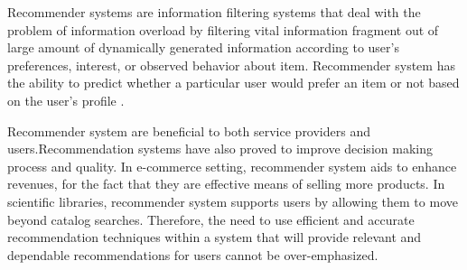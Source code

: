 Recommender systems are information filtering systems that deal with the problem of information overload by filtering vital information fragment out of large amount of dynamically generated information according to user's preferences, interest, or observed behavior about item. Recommender system has the ability to predict whether a particular user would prefer an item or not based on the user's profile \cite{rmain}.

Recommender system are beneficial to both service providers and users.Recommendation systems have also proved to improve decision making process and quality. In e-commerce setting, recommender system aids to enhance revenues, for the fact that they are effective means of selling more products. In scientific libraries, recommender system supports users by allowing them to move beyond catalog searches. Therefore, the need to use efficient and accurate recommendation techniques within a system that will provide relevant and dependable recommendations for users cannot be over-emphasized.

